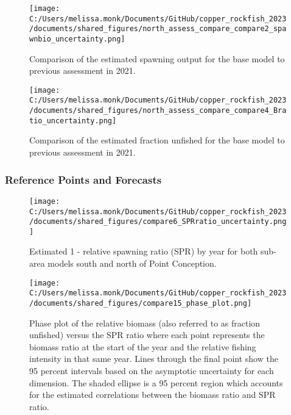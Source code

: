 \documentclass[11pt,
  english,
  letterpaper,
]{article}
\begin{document}
\begin{figure}
\centering
\texttt{[image: C:/Users/melissa.monk/Documents/GitHub/copper\_rockfish\_2023/documents/shared\_figures/north\_assess\_compare\_compare2\_spawnbio\_uncertainty.png]}
\caption{Comparison of the estimated spawning output for the base model to previous assessment in 2021.\label{fig:comp-assess-sb}}
\end{figure}

\newpage

\begin{figure}
\centering
\texttt{[image: C:/Users/melissa.monk/Documents/GitHub/copper\_rockfish\_2023/documents/shared\_figures/north\_assess\_compare\_compare4\_Bratio\_uncertainty.png]}
\caption{Comparison of the estimated fraction unfished for the base model to previous assessment in 2021.\label{fig:comp-assess-depl}}
\end{figure}

\newpage

\hypertarget{reference-points-and-forecasts}{%
\subsubsection{Reference Points and Forecasts}\label{reference-points-and-forecasts}}

\begin{figure}
\centering
\texttt{[image: C:/Users/melissa.monk/Documents/GitHub/copper\_rockfish\_2023/documents/shared\_figures/compare6\_SPRratio\_uncertainty.png]}
\caption{Estimated 1 - relative spawning ratio (SPR) by year for both sub-area models south and north of Point Conception.\label{fig:1-spr}}
\end{figure}

\clearpage

\begin{figure}
\centering
\texttt{[image: C:/Users/melissa.monk/Documents/GitHub/copper\_rockfish\_2023/documents/shared\_figures/compare15\_phase\_plot.png]}
\caption{Phase plot of the relative biomass (also referred to as fraction unfished) versus the SPR ratio where each point represents the biomass ratio at the start of the year and the relative fishing intensity in that same year. Lines through the final point show the 95 percent intervals based on the asymptotic uncertainty for each dimension. The shaded ellipse is a 95 percent region which accounts for the estimated correlations between the biomass ratio and SPR ratio.\label{fig:phase}}
\end{figure}
\end{document}
